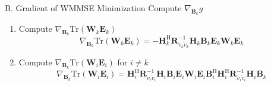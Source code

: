 \documentclass[aspectratio=169, 10pt]{beamer}
\begin{document}
\begin{frame}[label=main-wmmse-grad]{B. Gradient of WMMSE Minimization}
    Compute $\nabla_{\mathbf{B}_k} g$
    \begin{enumerate}
        \item Compute $\nabla_{\mathbf{B}_k}\mathrm{Tr}\left(\mathbf{W}_k \mathbf{E}_k\right)$
              \begin{equation}
                  \nabla_{\mathbf{B}_k}\mathrm{Tr}\left(\mathbf{W}_k \mathbf{E}_k\right)  =
                  -\mathbf{H}_k^\mathrm{H} \mathbf{R}_{\tilde{v}_k\tilde{v}_k}^{-1} \mathbf{H}_k \mathbf{B}_k \mathbf{E}_k\mathbf{W}_k \mathbf{E}_k
                  \tag{20}
              \end{equation}

              \begin{flushright}
                  \hyperlink{app-wmmse-grad1}{}
              \end{flushright}
        \item Compute $\nabla_{\mathbf{B}_k}\mathrm{Tr}\left(\mathbf{W}_i \mathbf{E}_i\right)$ for $i \neq k$
              \begin{equation}
                  \nabla_{\mathbf{B}_k}\mathrm{Tr}\left(\mathbf{W}_i \mathbf{E}_i\right) =
                  \mathbf{H}_i^\mathrm{H} \mathbf{R}_{\tilde{v}_i\tilde{v}_i}^{-1} \mathbf{H}_i \mathbf{B}_i \mathbf{E}_i\mathbf{W}_i\mathbf{E}_i
                  \mathbf{B}_i^\mathrm{H}
                  \mathbf{H}_i^\mathrm{H} \mathbf{R}_{\tilde{v}_i\tilde{v}_i}^{-1} \mathbf{H}_i \mathbf{B}_k
                  \tag{21}
              \end{equation}

              \begin{flushright}
                  \hyperlink{app-wmmse-grad2}{}
              \end{flushright}
    \end{enumerate}
\end{frame}
\end{document}
